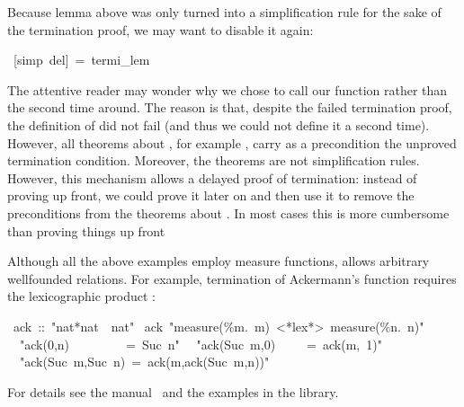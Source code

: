 \begin{isabelle}
\begin{isamarkuptext}
Because lemma  above was only turned into a
simplification rule for the sake of the termination proof, we may want to
disable it again:%
\end{isamarkuptext}%
~[simp~del]~=~termi\_lem%
\begin{isamarkuptext}%
The attentive reader may wonder why we chose to call our function 
rather than  the second time around. The reason is that, despite
the failed termination proof, the definition of  did not
fail (and thus we could not define it a second time). However, all theorems
about , for example , carry as a precondition the
unproved termination condition. Moreover, the theorems  are
not simplification rules. However, this mechanism allows a delayed proof of
termination: instead of proving  up front, we could prove
it later on and then use it to remove the preconditions from the theorems
about . In most cases this is more cumbersome than proving things
up front

Although all the above examples employ measure functions, 
allows arbitrary wellfounded relations. For example, termination of
Ackermann's function requires the lexicographic product :%
\end{isamarkuptext}%
~ack~::~{"}nat*nat~{\isasymRightarrow}~nat{"}\isanewline
{}~ack~{"}measure(\%m.~m)~<*lex*>~measure(\%n.~n){"}\isanewline
~~{"}ack(0,n)~~~~~~~~~=~Suc~n{"}\isanewline
~~{"}ack(Suc~m,0)~~~~~=~ack(m,~1){"}\isanewline
~~{"}ack(Suc~m,Suc~n)~=~ack(m,ack(Suc~m,n)){"}%
\begin{isamarkuptext}%
\noindent
For details see the manual~\cite{isabelle-HOL} and the examples in the
library.%
\end{isamarkuptext}%
\end{isabelle}%
